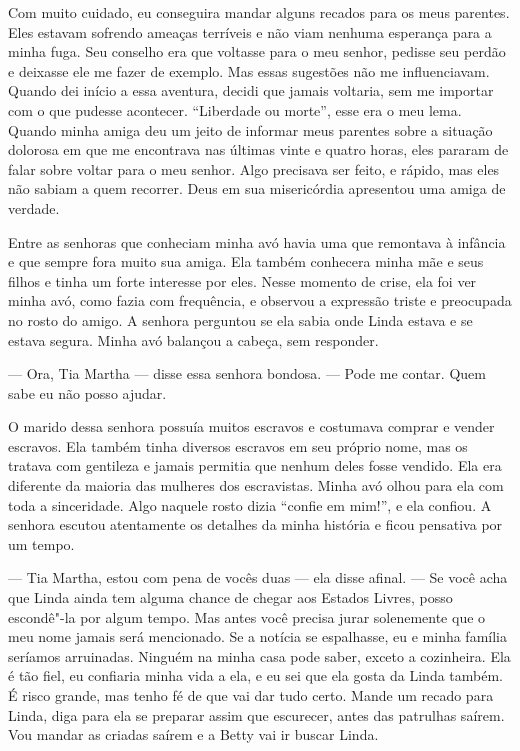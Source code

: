 Com muito cuidado, eu conseguira mandar
alguns recados para os meus parentes. Eles estavam sofrendo ameaças
terríveis e não viam nenhuma esperança para a minha fuga. Seu conselho
era que voltasse para o meu senhor, pedisse seu perdão e deixasse ele me
fazer de exemplo. Mas essas sugestões não me influenciavam. Quando dei
início a essa aventura, decidi que jamais voltaria, sem me importar com
o que pudesse acontecer. ``Liberdade ou morte'', esse era o meu lema.
Quando minha amiga deu um jeito de informar meus parentes sobre a
situação dolorosa em que me encontrava nas últimas vinte e quatro horas,
eles pararam de falar sobre voltar para o meu senhor. Algo precisava ser
feito, e rápido, mas eles não sabiam a quem recorrer. Deus em sua
misericórdia apresentou uma amiga de verdade.

Entre as senhoras que conheciam minha
avó havia uma que remontava à infância e que sempre fora muito sua
amiga. Ela também conhecera minha mãe e seus filhos e tinha um forte
interesse por eles. Nesse momento de crise, ela foi ver minha avó, como
fazia com frequência, e observou a expressão triste e preocupada no
rosto do amigo. A senhora perguntou se ela sabia onde Linda estava e se
estava segura. Minha avó balançou a cabeça, sem responder.

--- Ora, Tia Martha --- disse essa senhora bondosa. --- Pode me contar.
Quem sabe eu não posso ajudar.

O marido dessa senhora possuía muitos escravos e costumava comprar e
vender escravos. Ela também tinha diversos escravos em seu próprio nome,
mas os tratava com gentileza e jamais permitia que nenhum deles fosse
vendido. Ela era diferente da maioria das mulheres dos escravistas.
Minha avó olhou para ela com toda a sinceridade. Algo naquele rosto
dizia ``confie em mim!'', e ela confiou. A senhora escutou atentamente
os detalhes da minha história e ficou pensativa por um tempo.

--- Tia Martha, estou com pena de vocês duas --- ela disse afinal. ---
Se você acha que Linda ainda tem alguma chance de chegar aos Estados
Livres, posso escondê"-la por algum tempo. Mas antes você precisa jurar
solenemente que o meu nome jamais será mencionado. Se a notícia se
espalhasse, eu e minha família seríamos arruinadas. Ninguém na minha
casa pode saber, exceto a cozinheira. Ela é tão fiel, eu confiaria minha
vida a ela, e eu sei que ela gosta da Linda também. É risco grande, mas
tenho fé de que vai dar tudo certo. Mande um recado para Linda, diga
para ela se preparar assim que escurecer, antes das patrulhas saírem.
Vou mandar as criadas saírem e a Betty vai ir buscar Linda.

